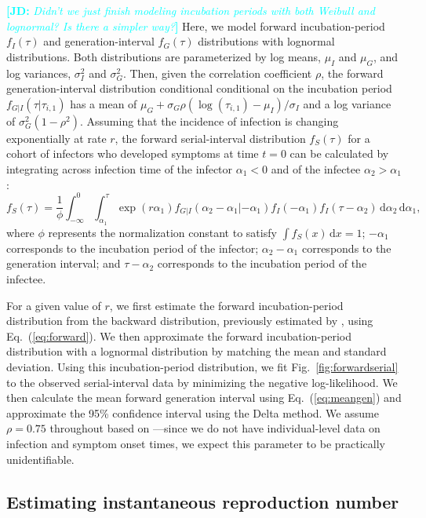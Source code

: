 \documentclass[12pt]{article}
\newcommand{\comment}{\showcomment}
\newcommand{\showcomment}[3]{\textcolor{#1}{\textbf{[#2: }\textsl{#3}\textbf{]}}}
\newcommand{\jd}[1]{\comment{cyan}{JD}{#1}}
\newcommand{\eref}[1]{Eq.~(\ref{eq:#1})}
\newcommand{\fref}[1]{Fig.~\ref{fig:#1}}
\newcommand{\dd}[1]{\ensuremath{\, \mathrm{d}#1}}
\newcommand{\dx}{\dd{x}}
\begin{document}
\jd{Didn't we just finish modeling incubation periods with both Weibull and lognormal? Is there a simpler way?}
Here, we model forward incubation-period $f_I(\tau)$ and generation-interval $f_G(\tau)$ distributions with lognormal distributions.
Both distributions are parameterized by log means, $\mu_I$ and $\mu_G$, and log variances, $\sigma_I^2$ and $\sigma_G^2$.
Then, given the correlation coefficient $\rho$, the forward generation-interval distribution conditional conditional on the incubation period $f_{G|I}(\tau|\tau_{i,1})$ has a mean of $\mu_G + \sigma_G \rho (\log(\tau_{i, 1}) - \mu_I)/\sigma_I$ and a log variance of $\sigma_G^2 (1 - \rho^2)$.
Assuming that the incidence of infection is changing exponentially at rate $r$, the forward serial-interval distribution $f_S(\tau)$ for a cohort of infectors who developed symptoms at time $t = 0$ can be calculated by integrating across infection time of the infector $\alpha_1 < 0$ and of the infectee $\alpha_2 > \alpha_1$ \citep{park2021forward}:
\begin{equation}
f_S(\tau) = \frac{1}{\phi} \int_{-\infty}^0\int_{\alpha_1}^\tau \exp(r \alpha_1) f_{G|I}(\alpha_2 - \alpha_1|- \alpha_1) f_I(- \alpha_1) f_I(\tau - \alpha_2) \dd \alpha_2 \dd \alpha_1,
\label{eq:forwardserial}
\end{equation}
where $\phi$ represents the normalization constant to satisfy $\int f_S(x) \dx = 1$;
$-\alpha_1$ corresponds to the incubation period of the infector;
$\alpha_2 - \alpha_1$ corresponds to the generation interval;
and $\tau - \alpha_2$ corresponds to the incubation period of the infectee.

For a given value of $r$, we first estimate the forward incubation-period distribution from the backward distribution, previously estimated by \cite{backer2021omicron}, using \eref{forward}.
We then approximate the forward incubation-period distribution with a lognormal distribution by matching the mean and standard deviation.
Using this incubation-period distribution, we fit \fref{forwardserial} to the observed serial-interval data by minimizing the negative log-likelihood.
We then calculate the mean forward generation interval using \eref{meangen} and approximate the 95\% confidence interval using the Delta method.
We assume $\rho = 0.75$ throughout based on \cite{sender2021unmitigated}---since we do not have individual-level data on infection and symptom onset times, we expect this parameter to be practically unidentifiable.

\subsection{Estimating instantaneous reproduction number}
\end{document}
